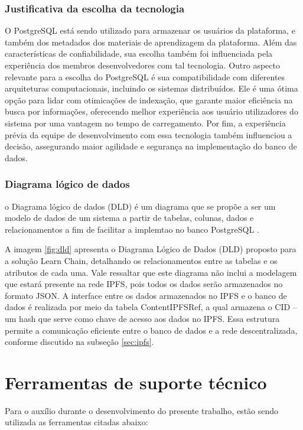 \subsubsection{Justificativa da escolha da tecnologia}
O PostgreSQL está sendo utilizado para armazenar os usuários da plataforma, e também dos metadados dos materiais de aprendizagem da plataforma. Além das características de confiabilidade, sua escolha também foi influenciada pela experiência dos membros desenvolvedores com tal tecnologia. Outro aspecto relevante para a escolha do PostgreSQL é sua compatibilidade com diferentes arquiteturas computacionais, incluindo os sistemas distribuídos. Ele é uma ótima opção para lidar com otimicações de indexação, que garante maior eficiência na busca por informações, oferecendo melhor experiência aos usuário utilizadores do sistema por uma vantagem no tempo de carregamento. Por fim, a experiência prévia da equipe de desenvolvimento com essa tecnologia também influenciou a decisão, assegurando maior agilidade e segurança na implementação do banco de dados.

\subsubsection{Diagrama lógico de dados}
o Diagrama lógico de dados (DLD) é um diagrama que se propõe a ser um modelo de dados de um sistema a partir de tabelas, colunas, dados e relacionamentos a fim de facilitar a implemtao no banco PostgreSQL \cite{lucidchart2025}.

A imagem \ref{fig:dld} apresenta o Diagrama Lógico de Dados (DLD) proposto para a solução Learn Chain, detalhando os relacionamentos entre as tabelas e os atributos de cada uma. Vale ressaltar que este diagrama não inclui a modelagem que estará presente na rede IPFS, pois todos os dados serão armazenados no formato JSON. A interface entre os dados armazenados no IPFS e o banco de dados é realizada por meio da tabela ContentIPFSRef, a qual armazena o CID – um hash que serve como chave de acesso aos dados no IPFS. Essa estrutura permite a comunicação eficiente entre o banco de dados e a rede descentralizada, conforme discutido na subseção \ref{sec:ipfs}.

\section{Ferramentas de suporte técnico}
Para o auxílio durante o desenvolvimento do presente trabalho, estão sendo utilizada as ferramentas citadas abaixo:

